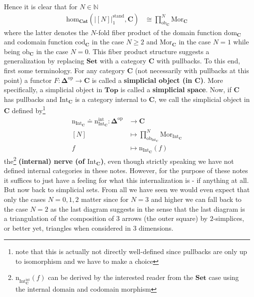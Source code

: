 \begin{cst}[Nerve]
Hence it is clear that for $N \in \mathbb{N}$
\begin{align*}
  \mathrm{hom}_{\mathbf{Cat}}
  \left(
    \left\vert
      [N]
    \right\vert_{1}^{\textrm{stand}},
    \mathbf{C}
  \right)
  &\cong
  \prod_{\mathrm{ob}_{\mathbf{C}}}^{N}
  \mathrm{Mor}_{\mathbf{C}}
\end{align*}
where the latter denotes the $N$-fold fiber product of the domain function $\mathrm{dom}_{\mathbf{C}}$ and codomain function $\mathrm{cod}_{\mathbf{C}}$ in the case $N \geq 2$ and $\mathrm{Mor}_{\mathbf{C}}$ in the case $N = 1$ while being $\mathrm{ob}_{\mathbf{C}}$ in the case $N = 0$.
This fiber product structure suggests a generalization by replacing $\mathbf{Set}$ with a category $\mathbf{C}$ with pullbacks.
To this end, first some terminology.
For any category $\mathbf{C}$ (not necessarily with pullbacks at this point) a functor $F \colon \mathbf{\Delta}^{\mathrm{op}} \rightarrow \mathbf{C}$ is called a \textbf{simplicial object (in $\mathbf{C}$)}.
More specifically, a simplicial object in $\mathbf{Top}$ is called a \textbf{simplicial space}.
Now, if $\mathbf{C}$ has pullbacks and $\mathrm{Int}_{\mathbf{C}}$ is a category internal to $\mathbf{C}$, we call the simplicial object in $\mathbf{C}$ defined by\footnote{note that this is actually not directly well-defined since pullbacks are only up to isomorphism and we have to make a choice}
\begin{align*}
  \mathrm{n}_{\mathrm{Int}_{\mathbf{C}}}
  \doteq
  \mathrm{n}_{\mathrm{Int}_{\mathbf{C}}}^{\textrm{int}}
  \colon
  \mathbf{\Delta}^{\mathrm{op}}
  &\rightarrow
  \mathbf{C}
  \\
  [N]
  &\mapsto
  \prod_{\mathrm{ob}_{\mathrm{Int}_{\mathbf{C}}}}^{N}
  \mathrm{Mor}_{\mathrm{Int}_{\mathbf{C}}}
  \\
  f
  &\mapsto
  \mathrm{n}_{\mathrm{Int}_{\mathbf{C}}}(f)
\end{align*}
the\footnote{$\mathrm{n}_{\mathrm{Int}_{\mathbf{C}}^{\textrm{int}}}(f)$ can be derived by the interested reader from the $\mathbf{Set}$ case using the internal domain and codomain morphism} \textbf{(internal) nerve (of $\mathrm{Int}_{\mathbf{C}}$)}, even though strictly speaking we have not defined internal categories in these notes.
However, for the purpose of these notes it suffices to just have a feeling for what this internalization is - if anything at all.
But now back to simplicial sets.
From all we have seen we would even expect that only the cases $N = 0,1,2$ matter since for $N = 3$ and higher we can fall back to the case $N = 2$ as the last diagram suggests in the sense that the last diagram is a {\glqq}triangulation{\grqq} of the composition of $3$ arrows (the outer square) by $2$-simplices, or better yet, triangles when considered in $3$ dimensions.

\end{cst}
